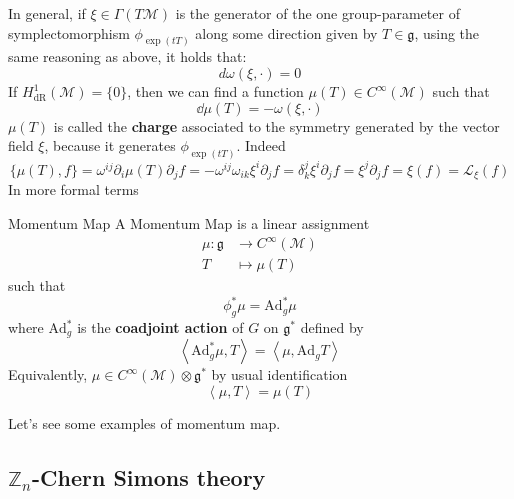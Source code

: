 \documentclass[11pt]{article}
\theoremstyle{definition}
\numberwithin{equation}{section}
\begin{document}
In general, if $\xi \in \Gamma(T \mathcal{M})$ is the generator of the one group-parameter of symplectomorphism $\phi_{\exp(t T)}$ along some direction given by $T \in \mathfrak{g}$, using the same reasoning as above, it holds that:
\begin{equation}
    d \omega(\xi, \cdot) =0
\end{equation}
If $H^1_{\text{dR}}(\mathcal{M})= \{0\}$, then we can find a function $\mu(T) \in C^{\infty}(\mathcal{M})$ such that
\begin{equation*}
    \dd \mu(T) = - \omega(\xi, \cdot)
\end{equation*}
$\mu(T)$ is called the \textbf{charge} associated to the symmetry generated by the vector field $\xi$, because it generates $\phi_{\exp(t T)}$. Indeed
\begin{equation}
    \{ \mu(T), f\} = \omega^{ij} \partial_i \mu(T)\partial_j f = - \omega^{ij} \omega_{ik} \xi^i \partial_j f = \delta^j_k \xi^i \partial_j f = \xi^j \partial_j f = \xi(f) = \mathcal{L}_{\xi}(f)
\end{equation}
In more formal terms
\begin{defn}{Momentum Map}{}
   A Momentum Map is a linear assignment
  \begin{equation}
  \begin{aligned}
  	 \mu:  \mathfrak{g} &\to C^{\infty}(\mathcal{M})\\
	T &\mapsto \mu(T)
    \end{aligned}
\end{equation}
such that
\begin{equation}
     \phi_g^* \mu = \text{Ad}^*_g \mu
\end{equation}
where $\text{Ad}^*_g$ is the \textbf{coadjoint action} of $G$ on $\mathfrak{g}^*$ defined by
\begin{equation}
    \left \langle \text{Ad}^*_g \mu , T \right \rangle = \left \langle \mu , \text{Ad}_g T \right \rangle
\end{equation}
Equivalently, $\mu \in  C^{\infty}(\mathcal{M}) \otimes \mathfrak{g}^*$ by usual identification
\begin{equation}
    \left \langle \mu, T \right \rangle = \mu(T)
\end{equation}
\end{defn} 
Let's see some examples of momentum map.

\subsection{$\mathbb{Z}_n$-Chern Simons theory}\label{ZNCS}
\end{document}
